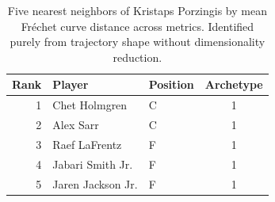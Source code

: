 \begin{table}[htbp]
  \centering\small
  \begin{tabular}{rllc}
    \toprule
    Rank & Player & Position & Archetype \\
    \midrule
    1 & Chet Holmgren & C & 1 \\
    2 & Alex Sarr & C & 1 \\
    3 & Raef LaFrentz & F & 1 \\
    4 & Jabari Smith Jr. & F & 1 \\
    5 & Jaren Jackson Jr. & F & 1 \\
    \bottomrule
  \end{tabular}
  \caption{Five nearest neighbors of Kristaps Porzingis by mean Fr\'{e}chet curve distance across metrics. Identified purely from trajectory shape without dimensionality reduction.}
  \label{tab:Kristaps_Porzingis_frechet_curve_neighbors}
\end{table}

